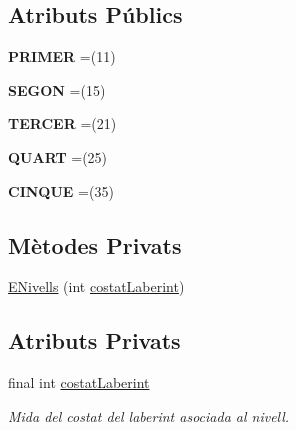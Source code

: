 \subsection*{Atributs Públics}
\begin{DoxyCompactItemize}
\item 
\hypertarget{enumlogica_1_1_usuari_1_1_e_nivells_a2436675cfd2cb10162a2b261ecb28162}{{\bfseries P\+R\+I\+M\+E\+R} =(11)}\label{enumlogica_1_1_usuari_1_1_e_nivells_a2436675cfd2cb10162a2b261ecb28162}

\item 
\hypertarget{enumlogica_1_1_usuari_1_1_e_nivells_a0283f8cf5c54d654030083f2d4906fc3}{{\bfseries S\+E\+G\+O\+N} =(15)}\label{enumlogica_1_1_usuari_1_1_e_nivells_a0283f8cf5c54d654030083f2d4906fc3}

\item 
\hypertarget{enumlogica_1_1_usuari_1_1_e_nivells_a2a681d41d24fbca28fbc31dc529e8490}{{\bfseries T\+E\+R\+C\+E\+R} =(21)}\label{enumlogica_1_1_usuari_1_1_e_nivells_a2a681d41d24fbca28fbc31dc529e8490}

\item 
\hypertarget{enumlogica_1_1_usuari_1_1_e_nivells_a56a97ef78dd26d2a64876be80f44a0d9}{{\bfseries Q\+U\+A\+R\+T} =(25)}\label{enumlogica_1_1_usuari_1_1_e_nivells_a56a97ef78dd26d2a64876be80f44a0d9}

\item 
\hypertarget{enumlogica_1_1_usuari_1_1_e_nivells_a223c29a935e04dc45900ec9bac5d3f54}{{\bfseries C\+I\+N\+Q\+U\+E} =(35)}\label{enumlogica_1_1_usuari_1_1_e_nivells_a223c29a935e04dc45900ec9bac5d3f54}

\end{DoxyCompactItemize}
\subsection*{Mètodes Privats}
\begin{DoxyCompactItemize}
\item 
\hyperlink{enumlogica_1_1_usuari_1_1_e_nivells_ad4728d82ae428dc7545b008c24adc7df}{E\+Nivells} (int \hyperlink{enumlogica_1_1_usuari_1_1_e_nivells_a95c4ccbfb2ff5c63780c96e43e07b840}{costat\+Laberint})
\end{DoxyCompactItemize}
\subsection*{Atributs Privats}
\begin{DoxyCompactItemize}
\item 
\hypertarget{enumlogica_1_1_usuari_1_1_e_nivells_a95c4ccbfb2ff5c63780c96e43e07b840}{final int \hyperlink{enumlogica_1_1_usuari_1_1_e_nivells_a95c4ccbfb2ff5c63780c96e43e07b840}{costat\+Laberint}}\label{enumlogica_1_1_usuari_1_1_e_nivells_a95c4ccbfb2ff5c63780c96e43e07b840}

\begin{DoxyCompactList}\small\item\em Mida del costat del laberint asociada al nivell. \end{DoxyCompactList}\end{DoxyCompactItemize}


